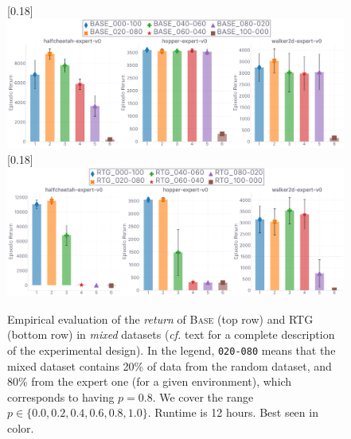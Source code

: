 \begin{figure}[H]
  \center\scalebox{0.18}[0.18]{\includegraphics{Plots/inductive_bias/base/plots_main_eval_env_ret_barplot.pdf}}
  \center\scalebox{0.18}[0.18]{\includegraphics{Plots/inductive_bias/rtg/plots_main_eval_env_ret_barplot.pdf}}
  \caption{Empirical evaluation of the \emph{return} of \textsc{Base} (top row) and RTG (bottom row)
  in \emph{mixed} datasets
  (\textit{cf.} text for a complete description of the experimental design).
  In the legend, \texttt{020-080} means that the mixed dataset contains 20\% of data from the random
  dataset, and 80\% from the expert one (for a given environment), which corresponds to having $p=0.8$.
  We cover the range $p \in \{0.0,0.2,0.4,0.6,0.8,1.0\}$.
  Runtime is 12 hours. Best seen in color.}
  \label{basertgmixed:barplot}
\end{figure}

